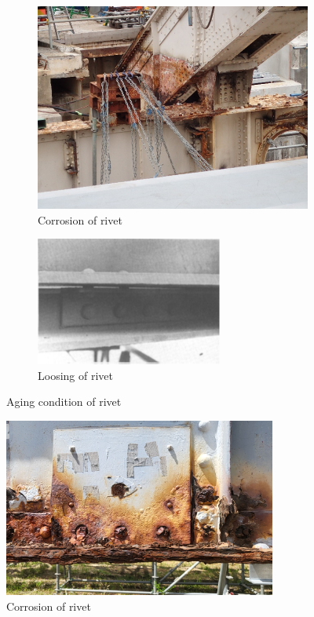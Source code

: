 \begin{figure}
    \centering
    \begin{subfigure}[t]{0.3\linewidth}
        \centering
        \includegraphics[]{imgs/ch2/rivet-cor.png}
        \caption{Corrosion of rivet}
        \label{fig-corriv}
    \end{subfigure}
    \hfill
    \begin{subfigure}[t]{0.55\linewidth}
        \centering
        \includegraphics[]{imgs/ch2/rivet-loss.png}
        \caption{Loosing of rivet}
        \label{fig-losriv}
    \end{subfigure}
    \caption{Aging condition of rivet}
\end{figure}

\begin{figure}
    \centering
    \includegraphics[width=0.8\textwidth]{imgs/ch2/rivet-cor2.jpg}
    \caption{Corrosion of rivet}
    \label{fig-rivet-cor2}
\end{figure}

